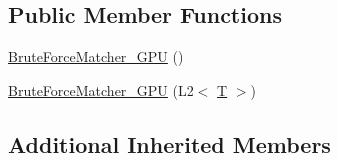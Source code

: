 \subsection*{Public Member Functions}
\begin{DoxyCompactItemize}
\item 
\hyperlink{classcv_1_1gpu_1_1BruteForceMatcher__GPU_3_01L2_3_01T_01_4_01_4_a75d21d90f02917dd3030a416a32c8990}{Brute\-Force\-Matcher\-\_\-\-G\-P\-U} ()
\item 
\hyperlink{classcv_1_1gpu_1_1BruteForceMatcher__GPU_3_01L2_3_01T_01_4_01_4_a235f1d531935cf38e91f203ee1c11dbc}{Brute\-Force\-Matcher\-\_\-\-G\-P\-U} (L2$<$ \hyperlink{calib3d_8hpp_a3efb9551a871ddd0463079a808916717}{T} $>$)
\end{DoxyCompactItemize}
\subsection*{Additional Inherited Members}


